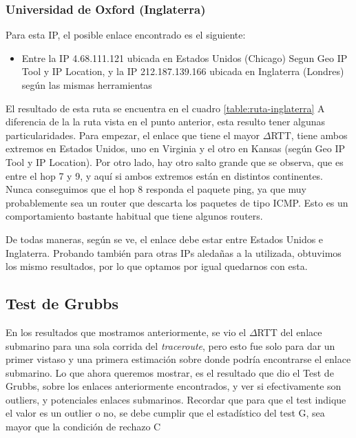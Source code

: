 \subsubsection{Universidad de Oxford (Inglaterra)}

Para esta IP, el posible enlace encontrado es el siguiente:

\begin{itemize}
	\item Entre la IP 4.68.111.121 ubicada en Estados Unidos (Chicago) Segun Geo IP Tool y IP Location, y la IP 212.187.139.166 ubicada en Inglaterra (Londres) según las mismas herramientas
\end{itemize}

El resultado de esta ruta se encuentra en el cuadro \ref{table:ruta-inglaterra} A diferencia de la la ruta vista en el punto anterior, esta resulto tener algunas particularidades. Para empezar, el enlace que tiene el mayor $\Delta$RTT, tiene ambos extremos en Estados Unidos, uno en Virginia y el otro en Kansas (según Geo IP Tool y IP Location). Por otro lado, hay otro salto grande que se observa, que es entre el hop 7 y 9, y aquí si ambos extremos están en distintos continentes. Nunca conseguimos que el hop 8 responda el paquete ping, ya que muy probablemente sea un router que descarta los paquetes de tipo ICMP. Esto es un comportamiento bastante habitual que tiene algunos routers.

De todas maneras, según se ve, el enlace debe estar entre Estados Unidos e Inglaterra. Probando también para otras IPs aledañas a la utilizada, obtuvimos los mismo resultados, por lo que optamos por igual quedarnos con esta.

\subsection{Test de Grubbs}

En los resultados que mostramos anteriormente, se vio el $\Delta$RTT del enlace submarino para una sola corrida del \textit{traceroute}, pero esto fue solo para dar un primer vistaso y una primera estimación sobre donde podría encontrarse el enlace submarino. Lo que ahora queremos mostrar, es el resultado que dio el Test de Grubbs, sobre los enlaces anteriormente encontrados, y ver si efectivamente son outliers, y potenciales enlaces submarinos. Recordar que para que el test indique el valor es un outlier o no, se debe cumplir que el estadístico del test G, sea mayor que la condición de rechazo C\\


